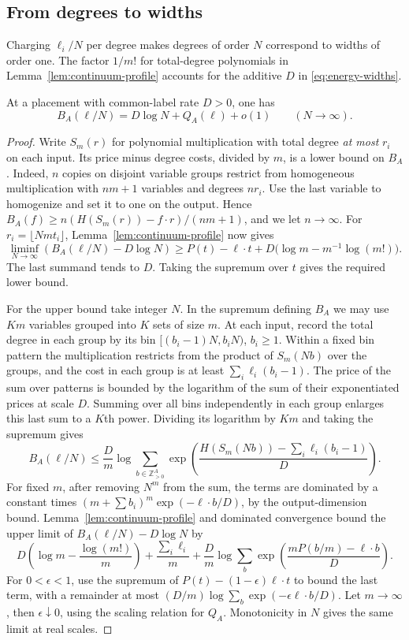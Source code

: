 \subsection{From degrees to widths}

Charging $\ell_i/N$ per degree makes degrees of order $N$ correspond
to widths of order one. The factor $1/m!$ for total-degree polynomials
in Lemma~\ref{lem:continuum-profile} accounts for the additive $D$ in
\eqref{eq:energy-widths}.

\begin{lemma}\label{lem:continuum-energy}
At a placement with common-label rate $D>0$, one has
\begin{equation}\label{eq:src6}
 B_A(\ell/N)=D\log N+Q_A(\ell)+o(1)
 \qquad(N\longrightarrow\infty).
\end{equation}
\end{lemma}

\begin{proof}
Write $S_m(r)$ for polynomial multiplication with total degree
\emph{at most} $r_i$ on each input. Its price minus degree costs, divided
by $m$, is a lower bound on $B_A$. Indeed, $n$ copies on disjoint variable
groups restrict from homogeneous multiplication with $nm+1$ variables
and degrees $nr_i$. Use the last variable to homogenize and set it to one
on the output. Hence
$B_A(f)\ge n(H(S_m(r))-f\cdot r)/(nm+1)$, and we let $n\to\infty$.
For $r_i=\lfloor Nm t_i\rfloor$, Lemma~\ref{lem:continuum-profile} now gives
\[
 \liminf_{N\to\infty}(B_A(\ell/N)-D\log N)
 \ge P(t)-\ell\cdot t+D\bigl(\log m-m^{-1}\log(m!)\bigr).
\]
The last summand tends to $D$. Taking the supremum over $t$ gives the
required lower bound.

For the upper bound take integer $N$. In the supremum defining $B_A$
we may use $Km$ variables grouped into $K$ sets of size $m$. At each
input, record the total degree in each group by its bin
$[(b_i-1)N,b_iN)$, $b_i\ge1$. Within a fixed bin pattern the
multiplication restricts from the product of $S_m(Nb)$ over the groups,
and the cost in each group is at least $\sum_i\ell_i(b_i-1)$. The price
of the sum over patterns is bounded by the logarithm of the sum of their
exponentiated prices at scale $D$. Summing over all bins independently
in each group enlarges this last sum to a $K$th power. Dividing its
logarithm by $Km$ and taking the supremum gives
\[
 B_A(\ell/N)\le \frac Dm\log\sum_{b\in\mathbb Z_{>0}^A}
 \exp\left(\frac{H(S_m(Nb))-\sum_i\ell_i(b_i-1)}{D}\right).
\]
For fixed $m$, after removing $N^m$ from the sum, the terms are dominated
by a constant times $(m+\sum b_i)^m\exp(-\ell\cdot b/D)$, by the
output-dimension bound. Lemma~\ref{lem:continuum-profile} and dominated
convergence bound the upper limit of $B_A(\ell/N)-D\log N$ by
\[
 D\left(\log m-\frac{\log(m!)}m\right)
 +\frac{\sum_i\ell_i}m+
 \frac Dm\log\sum_b\exp\left(\frac{mP(b/m)-\ell\cdot b}{D}\right).
\]
For $0<\epsilon<1$, use the supremum of
$P(t)-(1-\epsilon)\ell\cdot t$ to bound the last term, with a remainder
at most $(D/m)\log\sum_b\exp(-\epsilon\ell\cdot b/D)$.
Let $m\to\infty$, then $\epsilon\downarrow0$, using the scaling relation
for $Q_A$. Monotonicity in $N$ gives the same limit at real scales.
\end{proof}

